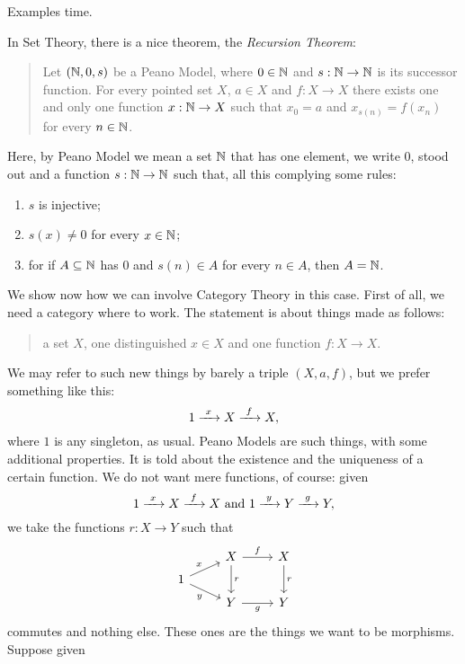 Examples time.

\begin{example}[Recursion]
In Set Theory, there is a nice theorem, the {\em Recursion Theorem}:
\begin{quotation}
Let \((\mathbb N, 0, s)\) be a Peano Model, where \(0 \in \mathbb N\) and \(s : \mathbb N \to \mathbb N\) is its successor function. For every pointed set \(X\), \(a \in X\) and \(f : X \to X\) there exists one and only one function \(x : \mathbb N \to X\) such that \(x_0 = a\) and \(x_{s(n)} = f(x_n)\) for every \(n \in \mathbb N\).
\end{quotation}
Here, by Peano Model we mean a set \(\mathbb N\) that has one element, we write \(0\), stood out and a function \(s : \mathbb N \to \mathbb N\) such that, all this complying some rules:
\begin{enumerate}
\item \(s\) is injective;
\item \(s(x) \ne 0\) for every \(x \in \mathbb N\);
\item for if \(A \subseteq \mathbb N\) has \(0\) and \(s(n) \in A\) for every \(n \in A\), then \(A = \mathbb N\).
\end{enumerate}
We show now how we can involve Category Theory in this case. First of all, we need a category where to work.\newline
The statement is about things made as follows:
\begin{quotation}
a set \(X\), one distinguished \(x \in X\) and one function \(f : X \to X\).
\end{quotation}
We may refer to such new things by barely a triple \((X, a, f)\), but we prefer something like this:
\[1 \xrightarrow{\ x\ } X \xrightarrow{\ f\ } X ,\]
where \(1\) is any singleton, as usual. Peano Models are such things, with some additional properties. It is told about the existence and the uniqueness of a certain function. We do not want mere functions, of course: given
\[1 \xrightarrow{\ x\ } X \xrightarrow{\ f\ } X \text{ and } 1 \xrightarrow{\ y\ } Y \xrightarrow{\ g\ } Y ,\]
we take the functions \(r : X \to Y\) such that
\[\begin{tikzcd}[row sep=tiny]
& X \ar["f", r] \ar["r", dd] & X \ar["r", dd] \\
1 \ar["x", ur] \ar["y", dr, swap] \\
& Y \ar["g", r, swap] & Y
\end{tikzcd}\]
commutes and nothing else.  These ones are the things we want to be morphisms. Suppose given
\[\begin{tikzcd}%

\end{tikzcd}\]
\end{example}
